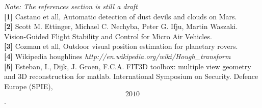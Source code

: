 






\emph{Note: The references section is still a draft}\\
\textbf{[1]} Castano et all, Automatic detection of dust devils and clouds on Mars.\\

\textbf{[2]} Scott M. Ettinger, Michael C. Nechyba, Peter G. Ifju, Martin Waszaki. Vision-Guided Flight Stability and Control for Micro Air Vehicles.\\

\textbf{[3]} Cozman et all, Outdoor visual position estimation for planetary rovers.\\

\textbf{[4]} Wikipedia houghlines \emph{http://en.wikipedia.org/wiki/Hough\_transform}\\

\textbf{[5]} Esteban, I., Dijk, J. Groen, F.C.A. FIT3D toolbox: multiple view geometry and 3D reconstruction for matlab. International Symposium on Security. Defence Europe (SPIE), \[2010\].\\


